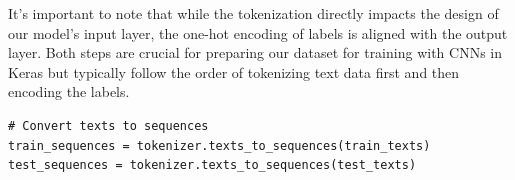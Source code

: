 It's important to note that while the tokenization directly impacts the design of our model's input layer, the one-hot encoding of labels is aligned with the output layer. Both steps are crucial for preparing our dataset for training with CNNs in Keras but typically follow the order of tokenizing text data first and then encoding the labels.

\begin{lstlisting}
# Convert texts to sequences
train_sequences = tokenizer.texts_to_sequences(train_texts)
test_sequences = tokenizer.texts_to_sequences(test_texts)
\end{lstlisting}
